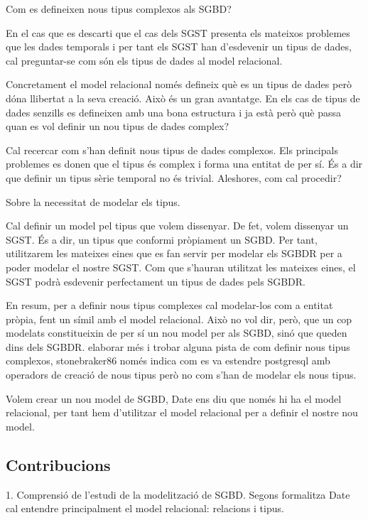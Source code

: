 Com es defineixen nous tipus complexos als SGBD?

En el cas que es descarti que el cas dels SGST presenta els mateixos problemes que les dades temporals i per tant els SGST han d'esdevenir un tipus de dades, cal preguntar-se com són els tipus de dades al model relacional.

Concretament el model relacional només defineix què es un tipus de dades però dóna llibertat a la seva creació. Això és un gran avantatge. En els cas de tipus de dades senzills es defineixen amb una bona estructura i ja està però què passa quan es vol definir un nou tipus de dades complex?

Cal recercar com s'han definit nous tipus de dades complexos. Els principals problemes es donen que el tipus és complex i forma una entitat de per sí. És a dir que definir un tipus sèrie temporal no és trivial. Aleshores, com cal procedir?



Sobre la necessitat de modelar els tipus.

Cal definir un model pel tipus que volem dissenyar.
De fet, volem dissenyar un SGST. És a dir, un tipus que conformi pròpiament un SGBD. Per tant, utilitzarem les mateixes eines que es fan servir per modelar els SGBDR per a poder modelar el nostre SGST. Com que s'hauran utilitzat les mateixes eines, el SGST podrà esdevenir perfectament un tipus de dades pels SGBDR.

En resum, per a definir nous tipus complexes cal modelar-los com a entitat pròpia, fent un símil amb el model relacional. Això no vol dir, però, que un cop modelats constitueixin de per sí un nou model per als SGBD, sinó que queden dins dels SGBDR.  elaborar més i trobar alguna pista de com definir nous tipus complexos, stonebraker86 només indica com es va estendre postgresql amb operadors de creació de nous tipus però no com s'han de modelar els nous tipus.

Volem crear un nou model de SGBD, Date ens diu que només hi ha el model relacional, per tant hem d'utilitzar el model relacional per a definir el nostre nou model.




\subsection{Contribucions}


1. Comprensió de l'estudi de la modelització de SGBD. Segons formalitza Date cal entendre principalment el model relacional: relacions i tipus. 

